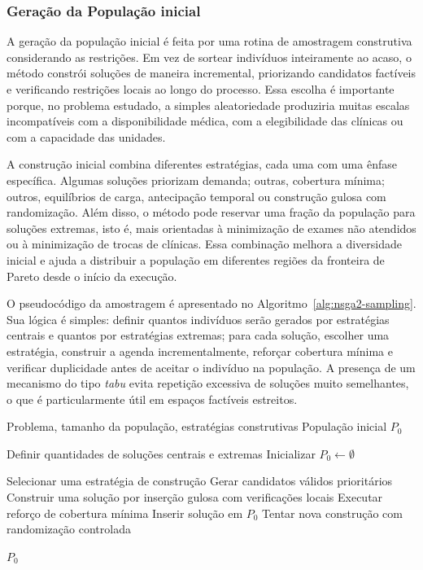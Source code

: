 \subsubsection{Geração da População inicial}

A geração da população inicial é feita por uma rotina de amostragem construtiva considerando as  restrições. Em vez de sortear indivíduos inteiramente ao acaso, o método constrói soluções de maneira incremental, priorizando candidatos factíveis e verificando restrições locais ao longo do processo. Essa escolha é importante porque, no problema estudado, a simples aleatoriedade produziria muitas escalas incompatíveis com a disponibilidade médica, com a elegibilidade das clínicas ou com a capacidade das unidades.

A construção inicial combina diferentes estratégias, cada uma com uma ênfase específica. Algumas soluções priorizam demanda; outras, cobertura mínima; outros, equilíbrios de carga, antecipação temporal ou construção gulosa com randomização. Além disso, o método pode reservar uma fração da população para soluções extremas, isto é, mais orientadas à minimização de exames não atendidos ou à minimização de trocas de clínicas. Essa combinação melhora a diversidade inicial e ajuda a distribuir a população em diferentes regiões da fronteira de Pareto desde o início da execução.

O pseudocódigo da amostragem é apresentado no Algoritmo~\ref{alg:nsga2-sampling}. Sua lógica é simples: definir quantos indivíduos serão gerados por estratégias centrais e quantos por estratégias extremas; para cada solução, escolher uma estratégia, construir a agenda incrementalmente, reforçar cobertura mínima e verificar duplicidade antes de aceitar o indivíduo na população. A presença de um mecanismo do tipo \textit{tabu} evita repetição excessiva de soluções muito semelhantes, o que é particularmente útil em espaços factíveis estreitos.

\begin{algoritmo}
    \caption{Geração da População Inicial}
    \label{alg:nsga2-sampling}
    \begin{algorithmic}[1]
        \Require Problema, tamanho da população, estratégias construtivas
        \Ensure População inicial $P_0$

        \State Definir quantidades de soluções centrais e extremas
        \State Inicializar $P_0 \leftarrow \emptyset$

        \State Selecionar uma estratégia de construção
        \State Gerar candidatos válidos prioritários
        \State Construir uma solução por inserção gulosa com verificações locais
        \State Executar reforço de cobertura mínima
        \State Inserir solução em $P_0$
        \Else
        \State Tentar nova construção com randomização controlada
        \EndIf
        \EndWhile

        \State \Return $P_0$
    \end{algorithmic}
\end{algoritmo}

